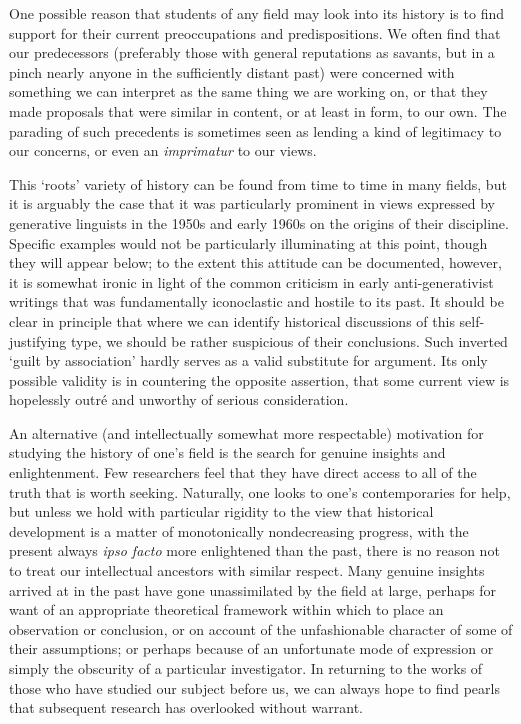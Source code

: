 One possible reason that students of any field may look into its
history is to find support for their current preoccupations and
predispositions. We often find that our predecessors (preferably those
with general reputations as savants, but in a pinch nearly anyone in
the sufficiently distant past) were concerned with something we can
interpret as the same thing we are working on, or that they made
proposals that were similar in content, or at least in form, to our
own. The parading of such precedents is sometimes seen as lending a
kind of legitimacy to our concerns, or even an \emph{imprimatur} to
our views.

This ‘roots' variety of history can be found from time to time in many
fields, but it is arguably the case that it was particularly prominent
in views expressed by generative linguists in the 1950s and early
1960s on the origins of their discipline. Specific examples would not
be particularly illuminating at this point, though they will appear
below; to the extent this attitude can be documented, however, it is
somewhat ironic in light of the common criticism in early
anti-generativist writings that  was fundamentally
iconoclastic and hostile to its past. It should be clear in principle
that where we can identify historical discussions of this
self-justifying type, we should be rather suspicious of their
conclusions. Such inverted ‘guilt by association' hardly serves as a
valid substitute for argument. Its only possible validity is in
countering the opposite assertion, that some current view is
hopelessly outré and unworthy of serious consideration.

An alternative (and intellectually somewhat more respectable)
motivation for studying the history of one's field is the search for
genuine insights and enlightenment. Few researchers feel that they
have direct access to all of the truth that is worth
seeking. Naturally, one looks to one's contemporaries for help, but
unless we hold with particular rigidity to the view that historical
development is a matter of monotonically nondecreasing progress, with
the present always \emph{ipso facto} more enlightened than the past,
there is no reason not to treat our intellectual ancestors with
similar respect. Many genuine insights arrived at in the past have
gone unassimilated by the field at large, perhaps for want of an
appropriate theoretical framework within which to place an observation
or conclusion, or on account of the unfashionable character of some of
their assumptions; or perhaps because of an unfortunate mode of
expression or simply the obscurity of a particular investigator. In
returning to the works of those who have studied our subject before
us, we can always hope to find pearls that subsequent research has
overlooked without warrant.


